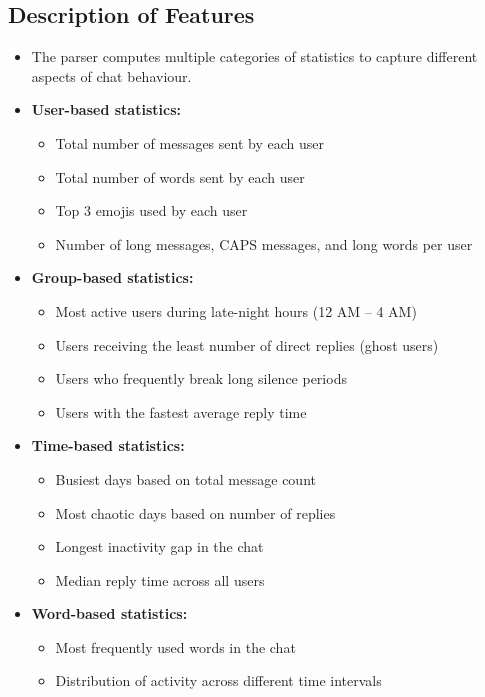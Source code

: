 \documentclass[11pt,a4paper]{article}
\begin{document}
\subsection{Description of Features}
\begin{itemize}
    \item The parser computes multiple categories of statistics to capture different aspects of chat behaviour.

    \item \textbf{User-based statistics:}
    \begin{itemize}
        \item Total number of messages sent by each user
        \item Total number of words sent by each user
        \item Top 3 emojis used by each user
        \item Number of long messages, CAPS messages, and long words per user
    \end{itemize}

    \item \textbf{Group-based statistics:}
    \begin{itemize}
        \item Most active users during late-night hours (12 AM -- 4 AM)
        \item Users receiving the least number of direct replies (ghost users)
        \item Users who frequently break long silence periods
        \item Users with the fastest average reply time
    \end{itemize}

    \item \textbf{Time-based statistics:}
    \begin{itemize}
        \item Busiest days based on total message count
        \item Most chaotic days based on number of replies
        \item Longest inactivity gap in the chat
        \item Median reply time across all users
    \end{itemize}

    \item \textbf{Word-based statistics:}
    \begin{itemize}
        \item Most frequently used words in the chat
        \item Distribution of activity across different time intervals
    \end{itemize}


\end{itemize}
\end{document}
